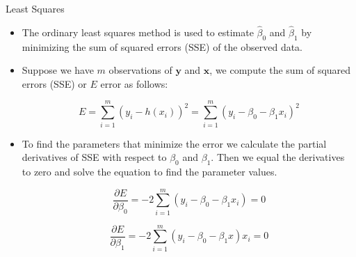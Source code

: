 \documentclass[handout]{beamer}
\begin{document}
\begin{frame}{Least Squares}
\scriptsize{
\begin{itemize}

 \item The ordinary least squares method is used to estimate  $\hat{\beta}_{0}$ and $\hat{\beta}_{1}$ by minimizing the sum of squared errors (SSE) of the observed data.

 \item Suppose we have $m$ observations of $\mathbf{y}$ and $\mathbf{x}$, we compute the sum of squared errors (SSE) or $E$ error as follows:

\begin{equation}
E = \sum_{i=1}^{m} (y_i-h(x_i))^2 =  \sum_{i=1}^{m} (y_i-\beta_{0}-\beta_{1}x_i)^2
\end{equation}

 \item To find the parameters that minimize the error we calculate the partial derivatives of SSE with respect to $\beta_{0}$ and $\beta_{1}$. Then we equal the derivatives to zero and solve the equation to find the parameter values.
 
 \begin{equation}
 \frac{\partial E}{ \partial \beta_0} = -2\sum_{i=1}^{m}(y_i-\beta_{0}-\beta_{1}x_i)=0
 \end{equation}

  \begin{equation}
 \frac{\partial E}{ \partial \beta_1} = -2\sum_{i=1}^{m}(y_i-\beta_{0}-\beta_{1}x)x_i=0
 \end{equation}



\end{itemize}



} 
\end{frame}
\end{document}
